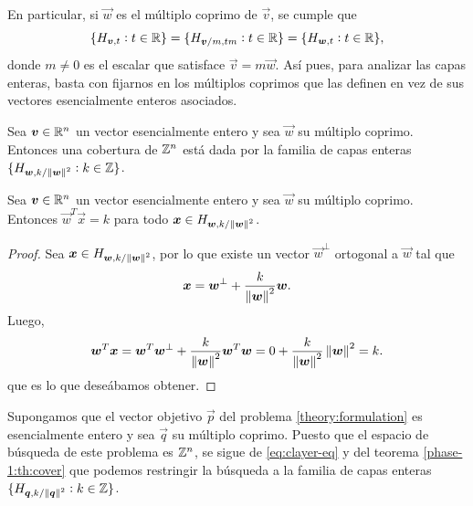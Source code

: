 En particular, si $\vec{w}$ es el múltiplo coprimo de $\vec{v}$, se cumple que
\begin{equation}
	\label{eq:clayer-eq}
	\lbrace H_{\boldsymbol{v}, t} \vcentcolon t \in \mathbb{R} \rbrace
	=
	\lbrace H_{\boldsymbol{v}/m, t m} \vcentcolon t \in \mathbb{R} \rbrace
	=
	\lbrace H_{\boldsymbol{w}, t} \vcentcolon t \in \mathbb{R} \rbrace,
\end{equation}
donde $m \neq 0$ es el escalar que satisface $\vec{v} = m\vec{w}$. Así pues, para analizar las capas
enteras, basta con fijarnos en los múltiplos coprimos que las definen en vez de sus vectores
esencialmente enteros asociados.

\begin{theorem}
	\label{phase-1:th:cover}
	Sea $\boldsymbol{v} \in \mathbb{R}^n$ un vector esencialmente entero y sea $\vec{w}$ su múltiplo coprimo.
	Entonces una cobertura de $\mathbb{Z}^n$ está dada por la familia de capas enteras
	$\lbrace H_{\boldsymbol{w}, k/\left\lVert \boldsymbol{w} \right\rVert^{2}} \vcentcolon k \in \mathbb{Z} \rbrace$.
\end{theorem}

\begin{lemma}
	\label{theory:lemma:utility}
	Sea $\boldsymbol{v} \in \mathbb{R}^n$ un vector esencialmente entero y sea $\vec{w}$ su múltiplo coprimo.
	Entonces $\vec{w}^T\vec{x} = k$ para todo $\boldsymbol{x} \in H_{\boldsymbol{w}, k/\left\lVert \boldsymbol{w} \right\rVert^{2}}$.
\end{lemma}
\begin{proof}
	Sea $\boldsymbol{x} \in H_{\boldsymbol{w}, k/\left\lVert \boldsymbol{w} \right\rVert^{2}}$, por lo que existe un vector $\vec{w}^\perp$ ortogonal a
	$\vec{w}$ tal que
	\begin{equation*}
		\boldsymbol{x} = \boldsymbol{w}^\perp + \frac{k}{\left\lVert \boldsymbol{w} \right\rVert^2}\boldsymbol{w}.
	\end{equation*}
	Luego,
	\begin{equation*}
		\boldsymbol{w}^T\boldsymbol{x} = \boldsymbol{w}^T\boldsymbol{w}^\perp + \frac{k}{\left\lVert \boldsymbol{w} \right\rVert^2}\boldsymbol{w}^T\boldsymbol{w}
		=
		0 + \frac{k}{\left\lVert \boldsymbol{w} \right\rVert^2}\left\lVert \boldsymbol{w} \right\rVert^2 = k.
	\end{equation*}
	que es lo que deseábamos obtener.
\end{proof}


Supongamos que el vector objetivo $\vec{p}$ del problema \eqref{theory:formulation} es esencialmente
entero y sea $\vec{q}$ su múltiplo coprimo. Puesto que el espacio de búsqueda de este problema es
$\mathbb{Z}^n$, se sigue de \eqref{eq:clayer-eq} y del teorema \ref{phase-1:th:cover} que podemos
restringir la búsqueda a la familia de capas enteras $\lbrace H_{\boldsymbol{q}, k/\left\lVert \boldsymbol{q} \right\rVert^{2}} \vcentcolon k \in \mathbb{Z} \rbrace$.

